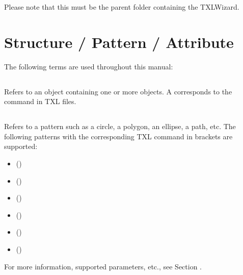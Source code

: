 \documentclass[letterpaper,10pt,english]{sphinxmanual}
\begin{document}
Please note that this must be the parent folder containing the TXLWizard.


\section{Structure / Pattern / Attribute}
\label{Chapters/10_Introduction:structure-pattern-attribute}
The following terms are used throughout this manual:


\subsection{}
\label{Chapters/10_Introduction:structure}
Refers to an object containing one or more  objects.
A  corresponds to the  command in TXL files.


\subsection{}
\label{Chapters/10_Introduction:pattern}
Refers to a pattern such as a circle, a polygon, an ellipse, a path, etc.
The following patterns with the corresponding TXL command in brackets are supported:
\begin{itemize}
\item {} 
 ()

\item {} 
 ()

\item {} 
 ()

\item {} 
 ()

\item {} 
 ()

\item {} 
 ()

\end{itemize}

For more information, supported parameters, etc., see Section {\hyperref[Chapters/40_PythonModuleReference:pythonmodulereferencepatterns]{}}.
\end{document}
